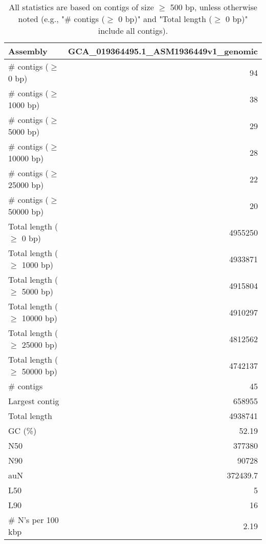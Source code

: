 \documentclass[12pt,a4paper]{article}
\begin{document}
\begin{table}[ht]
\begin{center}
\caption{All statistics are based on contigs of size $\geq$ 500 bp, unless otherwise noted (e.g., "\# contigs ($\geq$ 0 bp)" and "Total length ($\geq$ 0 bp)" include all contigs).}
\begin{tabular}{|l*{1}{|r}|}
\hline
Assembly & GCA\_019364495.1\_ASM1936449v1\_genomic \\ \hline
\# contigs ($\geq$ 0 bp) & 94 \\ \hline
\# contigs ($\geq$ 1000 bp) & 38 \\ \hline
\# contigs ($\geq$ 5000 bp) & 29 \\ \hline
\# contigs ($\geq$ 10000 bp) & 28 \\ \hline
\# contigs ($\geq$ 25000 bp) & 22 \\ \hline
\# contigs ($\geq$ 50000 bp) & 20 \\ \hline
Total length ($\geq$ 0 bp) & 4955250 \\ \hline
Total length ($\geq$ 1000 bp) & 4933871 \\ \hline
Total length ($\geq$ 5000 bp) & 4915804 \\ \hline
Total length ($\geq$ 10000 bp) & 4910297 \\ \hline
Total length ($\geq$ 25000 bp) & 4812562 \\ \hline
Total length ($\geq$ 50000 bp) & 4742137 \\ \hline
\# contigs & 45 \\ \hline
Largest contig & 658955 \\ \hline
Total length & 4938741 \\ \hline
GC (\%) & 52.19 \\ \hline
N50 & 377380 \\ \hline
N90 & 90728 \\ \hline
auN & 372439.7 \\ \hline
L50 & 5 \\ \hline
L90 & 16 \\ \hline
\# N's per 100 kbp & 2.19 \\ \hline
\end{tabular}
\end{center}
\end{table}
\end{document}
